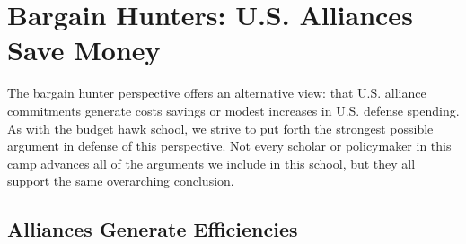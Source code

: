 

\section*{Bargain Hunters: U.S. Alliances Save Money}

The bargain hunter perspective offers an alternative view: that U.S. alliance commitments generate costs savings or modest increases in U.S. defense spending.\autocite[See, for example,][78]{rapphoopershields20} As with the budget hawk school, we strive to put forth the strongest possible argument in defense of this perspective. Not every scholar or policymaker in this camp advances all of the arguments we include in this school, but they all support the same overarching conclusion. 




\subsection*{Alliances Generate Efficiencies}

